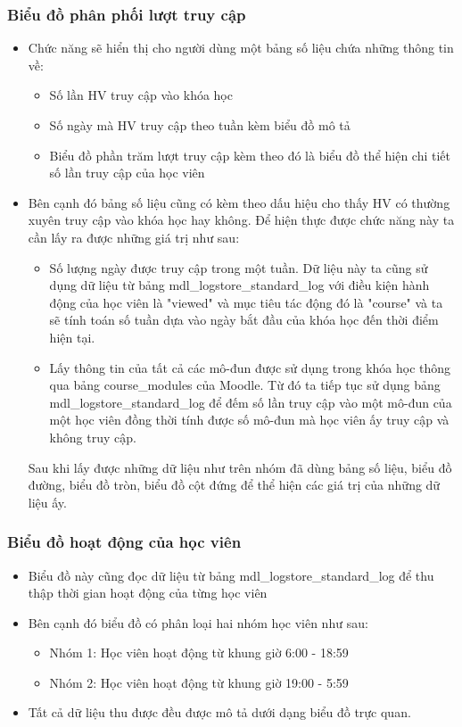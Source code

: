 \subsubsection{Biểu đồ phân phối lượt truy cập}
\begin{itemize}
	\item Chức năng sẽ hiển thị cho người dùng một bảng số liệu chứa những thông tin về:
	\begin{itemize}
		\item Số lần HV truy cập vào khóa học
		\item Số ngày mà HV truy cập theo tuần kèm biểu đồ mô tả
		\item Biểu đồ phần trăm lượt truy cập kèm theo đó là biểu đồ thể hiện chi tiết số lần truy cập của học viên
	\end{itemize}
	
	\item Bên cạnh đó bảng số liệu cũng có kèm theo dấu hiệu cho thấy HV có thường xuyên truy cập vào khóa học hay không. Để hiện thực được chức năng này ta cần lấy ra được những giá trị như sau:
	
	\begin{itemize}
		\item Số lượng ngày được truy cập trong một tuần. Dữ liệu này ta cũng sử dụng dữ liệu từ bảng mdl\_logstore\_standard\_log với điều kiện hành động của học viên là "viewed" và mục tiêu tác động đó là "course" và ta sẽ tính toán số tuần dựa vào ngày bắt đầu của khóa học đến thời điểm hiện tại.
		
		\item Lấy thông tin của tất cả các mô-đun được sử dụng trong khóa học thông qua bảng course\_modules của Moodle. Từ đó ta tiếp tục sử dụng bảng mdl\_logstore\_standard\_log để đếm số lần truy cập vào một mô-đun của một học viên đồng thời tính được số mô-đun mà học viên ấy truy cập và không truy cập.
	\end{itemize}
	
	Sau khi lấy được những dữ liệu như trên nhóm đã dùng bảng số liệu, biểu đồ đường, biểu đồ tròn, biểu đồ cột đứng để thể hiện các giá trị của những dữ liệu ấy.
	
\end{itemize}

\subsubsection{Biểu đồ hoạt động của học viên}
\begin{itemize}
	\item Biểu đồ này cũng đọc dữ liệu từ bảng mdl\_logstore\_standard\_log để thu thập thời gian hoạt động của từng học viên
	\item Bên cạnh đó biểu đồ có phân loại hai nhóm học viên như sau:
	\begin{itemize}
		\item Nhóm 1: Học viên hoạt động từ khung giờ 6:00 - 18:59
		\item Nhóm 2: Học viên hoạt động từ khung giờ 19:00 - 5:59
	\end{itemize}
	\item Tất cả dữ liệu thu được đều được mô tả dưới dạng biểu đồ trực quan.
\end{itemize}

